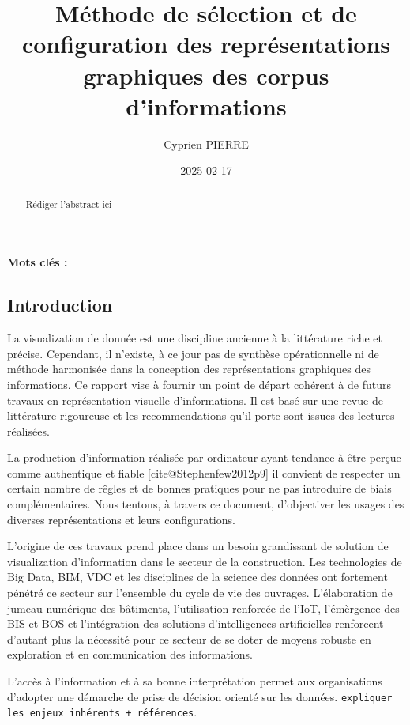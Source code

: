\documentclass[a4paper,12pt]{article}
\author{Cyprien PIERRE \orcidlink{0009-0009-9040-6795}}
\date{2025-02-17}
\title{Méthode de sélection et de configuration des représentations graphiques des corpus d'informations}
\begin{document}
\maketitle
\begin{abstract}
Rédiger l'abstract ici
\end{abstract}

\renewcommand\{\keywordsname\{\textbf{Mots clés : }

\begin{multicols}{2}
\section*{Introduction}
\label{sec:orgdc89aeb}
La visualization de donnée est une discipline ancienne à la littérature riche et précise. Cependant, il n'existe, à ce jour pas de synthèse opérationnelle ni de méthode harmonisée dans la conception des représentations graphiques des informations. Ce rapport vise à fournir un point de départ cohérent à de futurs travaux en représentation visuelle d'informations. Il est basé sur une revue de littérature rigoureuse et les recommendations qu'il porte sont issues des lectures réalisées.

La production d'information réalisée par ordinateur ayant tendance à être perçue comme authentique et fiable [cite@Stephenfew2012p9] il convient de respecter un certain nombre de rêgles et de bonnes pratiques pour ne pas introduire de biais complémentaires. Nous tentons, à travers ce document, d'objectiver les usages des diverses représentations et leurs configurations.

L'origine de ces travaux prend place dans un besoin grandissant de solution de visualization d'information dans le secteur de la construction. Les technologies de Big Data, BIM, VDC et les disciplines de la science des données ont fortement pénétré ce secteur sur l'ensemble du cycle de vie des ouvrages. \autocite{asiauniversitytaichungtaiwanResearchApplicationFunctiontechnologyaesthetics2020} L'élaboration de jumeau numérique des bâtiments, l'utilisation renforcée de l'IoT, l'émèrgence des BIS et BOS et l'intégration des solutions d'intelligences artificielles renforcent d'autant plus la nécessité pour ce secteur de se doter de moyens robuste en exploration et en communication des informations.

L'accès à l'information et à sa bonne interprétation permet aux organisations d'adopter une démarche de prise de décision orienté sur les données. \autocite{sosulskiDataVisualizationMade2019}  \texttt{expliquer les enjeux inhérents + références}.


\end{multicols}
\end{document}
